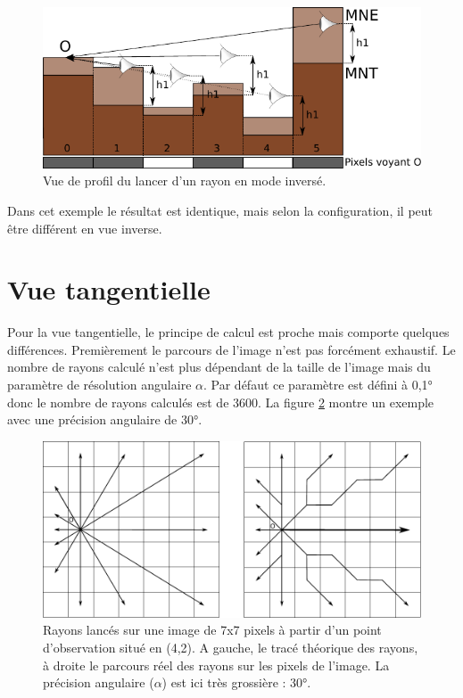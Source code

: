 \documentclass{report}
\begin{document}
\begin{figure}[H]
	\includegraphics{img/ray_side_inverse-fr.pdf} 
	\caption{Vue de profil du lancer d'un rayon en mode inversé.}
	\label{ray_side_inverse}
\end{figure}

Dans cet exemple le résultat est identique, mais selon la configuration, il peut être différent en vue inverse.

\section{Vue tangentielle}
\label{principles_tan}
Pour la vue tangentielle, le principe de calcul est proche mais comporte quelques différences. Premièrement le parcours de l'image n'est pas forcément exhaustif. Le nombre de rayons calculé n'est plus dépendant de la taille de l'image mais du paramètre de résolution angulaire $\alpha$. Par défaut ce paramètre est défini à 0,1° donc le nombre de rayons calculés est de 3600. La figure \ref{grid_tan} montre un exemple avec une précision angulaire de 30°.

\begin{figure}[H]
	\includegraphics[scale=0.8]{img/grid_tan.pdf} 
	\caption{Rayons lancés sur une image de 7x7 pixels à partir d'un point d'observation situé en (4,2). A gauche, le tracé théorique des rayons, à droite le parcours réel des rayons sur les pixels de l'image. La précision angulaire ($\alpha$) est ici très grossière : 30°.}
	\label{grid_tan}
\end{figure}
\end{document}
